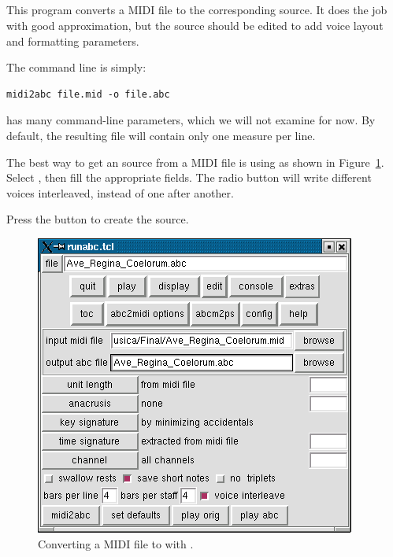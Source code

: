 \documentclass[a4paper,12pt]{book}
\begin{document}





\subsection{}

This program converts a MIDI file to the corresponding \ABC{} source.
It does the job with good approximation, but the source should be
edited to add voice layout and formatting parameters.

The command line is simply:

\begin{verbatim}
midi2abc file.mid -o file.abc
\end{verbatim}

 has many command-line parameters, which we will not
examine for now. By default, the resulting \ABC{} file will contain
only one measure per line.

The best way to get an \ABC{} source from a MIDI file is using
\runabc{} as shown in Figure~\ref{fig:runabc}. Select
, then fill the appropriate fields. The
 radio button will write different voices
interleaved, instead of one after another.

Press the button  to create the \ABC{} source.

\begin{figure}[htbp]
\centering
\includegraphics[scale=0.7]{runabc.png}
\caption{Converting a MIDI file to \ABC{} with \runabc{}.}
\label{fig:runabc}
\end{figure}
\end{document}
